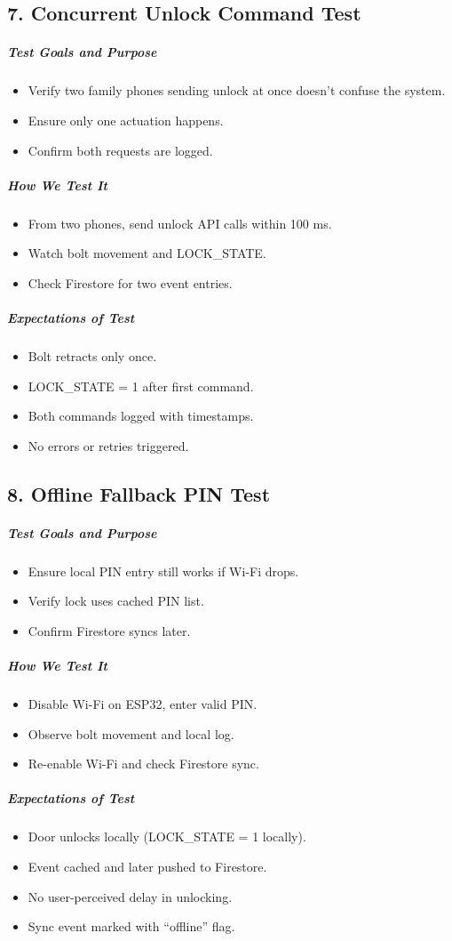 \subsection*{7. Concurrent Unlock Command Test}
\subparagraph{Test Goals and Purpose}
\begin{itemize}
    \item Verify two family phones sending unlock at once doesn't confuse the system.
    \item Ensure only one actuation happens.
    \item Confirm both requests are logged.
\end{itemize}
\subparagraph{How We Test It}
\begin{itemize}
    \item From two phones, send unlock API calls within 100 ms.
    \item Watch bolt movement and LOCK\_STATE.
    \item Check Firestore for two event entries.
\end{itemize}
\subparagraph{Expectations of Test}
\begin{itemize}
    \item Bolt retracts only once.
    \item LOCK\_STATE = 1 after first command.
    \item Both commands logged with timestamps.
    \item No errors or retries triggered.
\end{itemize}

\subsection*{8. Offline Fallback PIN Test}
\subparagraph{Test Goals and Purpose}
\begin{itemize}
    \item Ensure local PIN entry still works if Wi-Fi drops.
    \item Verify lock uses cached PIN list.
    \item Confirm Firestore syncs later.
\end{itemize}
\subparagraph{How We Test It}
\begin{itemize}
    \item Disable Wi-Fi on ESP32, enter valid PIN.
    \item Observe bolt movement and local log.
    \item Re-enable Wi-Fi and check Firestore sync.
\end{itemize}
\subparagraph{Expectations of Test}
\begin{itemize}
    \item Door unlocks locally (LOCK\_STATE = 1 locally).
    \item Event cached and later pushed to Firestore.
    \item No user-perceived delay in unlocking.
    \item Sync event marked with “offline” flag.
\end{itemize}

